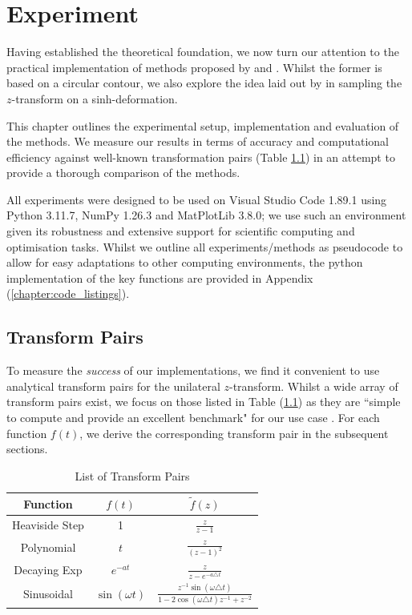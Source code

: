 \documentclass[a4paper]{report}
\begin{document}
\chapter{Experiment}
Having established the theoretical foundation, we now turn our attention to the practical implementation of methods proposed by \citet{AbateWhitt1992a, AbateWhitt1992b} and \citet{Cavers1978FFT}. Whilst the former is based on a circular contour, we also explore the idea laid out by \citet{levendorskii2022sinh} in sampling the $z$-transform on a sinh-deformation.

This chapter outlines the experimental setup, implementation and evaluation of the methods. We measure our results in terms of accuracy and computational efficiency against well-known transformation pairs (Table \ref{table:transform_pairs}) in an attempt to provide a thorough comparison of the methods.

All experiments were designed to be used on Visual Studio Code 1.89.1 using Python 3.11.7, NumPy 1.26.3 and MatPlotLib 3.8.0; we use such an environment given its robustness and extensive support for scientific computing and optimisation tasks. Whilst we outline all experiments/methods as pseudocode to allow for easy adaptations to other computing environments, the python implementation of the key functions are provided in Appendix (\ref{chapter:code_listings}).

\section{Transform Pairs}\label{section:transform_pairs}
To measure the \textit{success} of our implementations, we find it convenient to use analytical transform pairs for the unilateral $z$-transform. Whilst a wide array of transform pairs exist, we focus on those listed in Table (\ref{table:transform_pairs}) as they are ``simple to compute and provide an excellent benchmark" for our use case \citep{loveless2021guido}. For each function $f(t)$, we derive the corresponding transform pair in the subsequent sections.

\begin{table}[H]
    \centering
    \renewcommand{\arraystretch}{1.2} %
    \begin{tabular}{c|cc}
    \textbf{Function} & $f(t)$ & $\tilde{f}(z)$ \\
    \hline
    Heaviside Step & 1 & $\frac{z}{z-1}$ \\
    Polynomial & $t$ & $\frac{z}{(z-1)^2}$ \\
    Decaying Exp & $e^{-at}$ & $\frac{z}{z - e^{-a \triangle t}}$ \\
    Sinusoidal & $\sin(\omega t)$ & $\frac{z^{-1}\sin(\omega \triangle t)}{1 - 2\cos(\omega\triangle t)z^{-1} + z^{-2}}$ \\
    \end{tabular}
    
    \caption{List of Transform Pairs}
    \label{table:transform_pairs}
\end{table}
\end{document}
